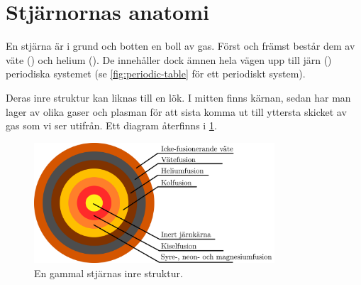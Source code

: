 \section{Stjärnornas anatomi}
En stjärna är i grund och botten en boll av gas. Först och främst består dem av väte () och helium (). De innehåller dock ämnen hela vägen upp till järn () periodiska systemet (se \cref{fig:periodic-table} för ett periodiskt system).

Deras inre struktur kan liknas till en lök. I mitten finns kärnan, sedan har man lager av olika gaser och plasman för att sista komma ut till yttersta skicket av gas som vi ser utifrån. Ett diagram återfinns i \cref{fig:star-anatomy}.

\begin{figure}[hb]
    \centering
    \includegraphics[width=0.8\textwidth]{img/star.png}
    \caption{En gammal stjärnas inre struktur.}
    \label{fig:star-anatomy}
\end{figure}